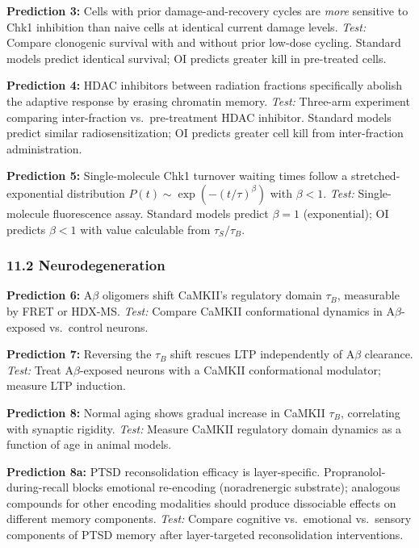 \documentclass[
]{article}
\begin{document}
\textbf{Prediction 3:} Cells with prior damage-and-recovery cycles are
\emph{more} sensitive to Chk1 inhibition than naive cells at identical
current damage levels. \emph{Test:} Compare clonogenic survival with and
without prior low-dose cycling. Standard models predict identical
survival; OI predicts greater kill in pre-treated cells.

\textbf{Prediction 4:} HDAC inhibitors between radiation fractions
specifically abolish the adaptive response by erasing chromatin memory.
\emph{Test:} Three-arm experiment comparing inter-fraction
vs.~pre-treatment HDAC inhibitor. Standard models predict similar
radiosensitization; OI predicts greater cell kill from inter-fraction
administration.

\textbf{Prediction 5:} Single-molecule Chk1 turnover waiting times
follow a stretched-exponential distribution
\(P(t) \sim \exp(-(t/\tau)^\beta)\) with \(\beta < 1\). \emph{Test:}
Single-molecule fluorescence assay. Standard models predict
\(\beta = 1\) (exponential); OI predicts \(\beta < 1\) with value
calculable from \(\tau_S / \tau_B\).

\hypertarget{neurodegeneration-1}{%
\subsubsection{11.2 Neurodegeneration}\label{neurodegeneration-1}}

\textbf{Prediction 6:} A\(\beta\) oligomers shift CaMKII's regulatory
domain \(\tau_B\), measurable by FRET or HDX-MS. \emph{Test:} Compare
CaMKII conformational dynamics in A\(\beta\)-exposed vs.~control
neurons.

\textbf{Prediction 7:} Reversing the \(\tau_B\) shift rescues LTP
independently of A\(\beta\) clearance. \emph{Test:} Treat
A\(\beta\)-exposed neurons with a CaMKII conformational modulator;
measure LTP induction.

\textbf{Prediction 8:} Normal aging shows gradual increase in CaMKII
\(\tau_B\), correlating with synaptic rigidity. \emph{Test:} Measure
CaMKII regulatory domain dynamics as a function of age in animal models.

\textbf{Prediction 8a:} PTSD reconsolidation efficacy is layer-specific.
Propranolol-during-recall blocks emotional re-encoding (noradrenergic
substrate); analogous compounds for other encoding modalities should
produce dissociable effects on different memory components. \emph{Test:}
Compare cognitive vs.~emotional vs.~sensory components of PTSD memory
after layer-targeted reconsolidation interventions.
\end{document}
